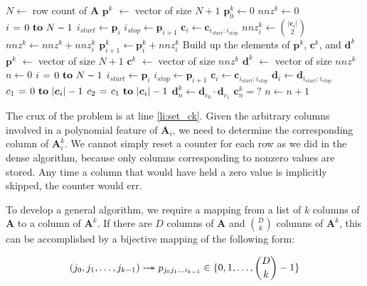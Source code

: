\documentclass{article}
\begin{document}
\begin{codebox}
\footnotesize
{}
    \li $N \gets$ row count of $\bm{A}$
    \li $\bm{p}^k$ $\gets$ vector of size $N+1$
    \li $\bm{p}^k_0 \gets 0$
    \li $nnz^k \gets 0$
    \li \For $i \gets 0 \To N-1$ \Do
    \li     $i_{start} \gets \bm{p}_i$
    \li     $i_{stop} \gets \bm{p}_{i+1}$
    \li     $\bm{c}_i \gets \bm{c}_{i_{start}:i_{stop}}$
    \li     $nnz^k_i \gets \binom{|\bm{c}_i|}{2}$ \label{li:row_nnz_count}
    \li     $nnz^k \gets nnz^k + nnz^k_i$
    \li     $\bm{p}^k_{i+1} \gets \bm{p}^k_i + nnz^k_i$
        \End
    \zi     
    \zi \Comment Build up the elements of $\bm{p}^k$, $\bm{c}^k$, and $\bm{d}^k$
    \li $\bm{p}^k$ $\gets$ vector of size $N+1$
    \li $\bm{c}^k$ $\gets$ vector of size $nnz^k$
    \li $\bm{d}^k$ $\gets$ vector of size $nnz^k$
    \li $n \gets 0$
    \li \For $i \gets 0 \To N-1$ \Do
    \li     $i_{start} \gets \bm{p}_i$
    \li     $i_{stop} \gets \bm{p}_{i+1}$
    \li     $\bm{c}_i \gets \bm{c}_{i_{start}:i_{stop}}$
    \li     $\bm{d}_i \gets \bm{d}_{i_{start}:i_{stop}}$
    \li     \For $c_1 \gets 0 \To |\bm{c}_i|-1$ \Do
    \li         \For $c_2 \gets c_1 \To |\bm{c}_i|-1$ \Do
    \li             $\bm{d}^k_{n} \gets \bm{d}_{c_0} \cdot \bm{d}_{c_1}$
    \li             $\bm{c}^k_{n} = ?$ \label{li:set_ck}
    \li             $n \gets n + 1$
                \End
            \End
       	\End
\end{codebox}

The crux of the problem is at line \ref{li:set_ck}.
Given the arbitrary columns involved in a polynomial feature of $\bm{A}_i$, we need to determine the corresponding column of $\bm{A}^k_i$.
We cannot simply reset a counter for each row as we did in the dense algorithm,  because only columns corresponding to nonzero values are stored.
Any time a column that would have held a zero value is implicitly skipped, the counter would err.

To develop a general algorithm, we require a mapping from a list of $k$ columns of $\bm{A}$ to a column of $\bm{A}^k$.
If there are $D$ columns of $\bm{A}$ and $\binom{D}{k}$ columns of $\bm{A}^k$, this can be accomplished by a bijective mapping of the following form:

\begin{equation}
(j_0, j_1, \dots, j_{k-1}) \rightarrowtail \hspace{-1.9ex} \twoheadrightarrow p_{j_0j_1 \dots i_{k-1}} \in \{0,1,\dots,\binom{D}{k}-1\} 
\end{equation}
\end{document}

